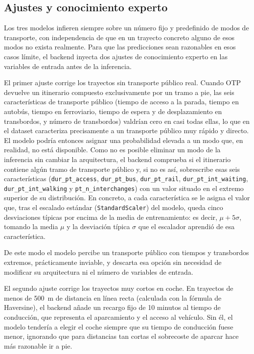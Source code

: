 \subsection{Ajustes y conocimiento experto}
\label{subsec:impl_lpmc_conocimiento}

Los tres modelos infieren siempre sobre un número fijo y predefinido de modos de transporte, con independencia de que en un trayecto concreto alguno de esos modos no exista realmente. Para que las predicciones sean razonables en esos casos límite, el backend inyecta dos ajustes de conocimiento experto en las variables de entrada antes de la inferencia.\newline

El primer ajuste corrige los trayectos sin transporte público real. Cuando OTP devuelve un itinerario compuesto exclusivamente por un tramo a pie, las seis características de transporte público (tiempo de acceso a la parada, tiempo en autobús, tiempo en ferroviario, tiempo de espera y de desplazamiento en transbordos, y número de transbordos) valdrían cero en casi todas ellas, lo que en el dataset caracteriza precisamente a un transporte público muy rápido y directo. El modelo podría entonces asignar una probabilidad elevada a un modo que, en realidad, no está disponible. Como no es posible eliminar un modo de la inferencia sin cambiar la arquitectura, el backend comprueba si el itinerario contiene algún tramo de transporte público y, si no es así, sobrescribe esas seis características (\texttt{dur\_pt\_access}, \texttt{dur\_pt\_bus}, \texttt{dur\_pt\_rail}, \texttt{dur\_pt\_int\_waiting}, \texttt{dur\_pt\_int\_walking} y \texttt{pt\_n\_interchanges}) con un valor situado en el extremo superior de su distribución. En concreto, a cada característica se le asigna el valor que, tras el escalado estándar (\texttt{StandardScaler}) del modelo, queda cinco desviaciones típicas por encima de la media de entrenamiento: es decir, $\mu + 5\sigma$, tomando la media $\mu$ y la desviación típica $\sigma$ que el escalador aprendió de esa característica. 

\newpage
De este modo el modelo percibe un transporte público con tiempos y transbordos extremos, prácticamente inviable, y descarta esa opción sin necesidad de modificar su arquitectura ni el número de variables de entrada.\newline

El segundo ajuste corrige los trayectos muy cortos en coche. En trayectos de menos de 500~m de distancia en línea recta (calculada con la fórmula de Haversine), el backend añade un recargo fijo de 10 minutos al tiempo de conducción, que representa el aparcamiento y el acceso al vehículo. Sin él, el modelo tendería a elegir el coche siempre que su tiempo de conducción fuese menor, ignorando que para distancias tan cortas el sobrecoste de aparcar hace más razonable ir a pie.\newline

